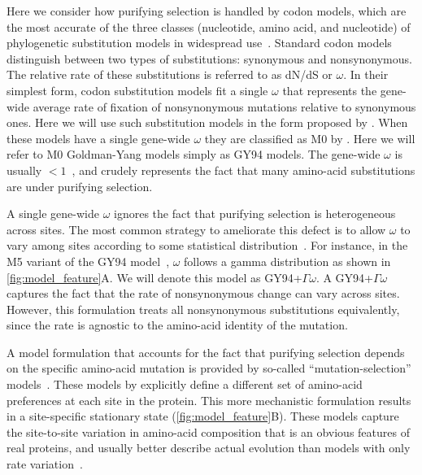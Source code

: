 \documentclass[11pt]{article}
\begin{document}
Here we consider how purifying selection is handled by codon models, which are the most accurate of the three classes (nucleotide, amino acid, and nucleotide) of phylogenetic substitution models in widespread use~\citep{arenas2015trends}.
Standard codon models distinguish between two types of substitutions: synonymous and nonsynonymous.
The relative rate of these substitutions is referred to as dN/dS or $\omega$.
In their simplest form, codon substitution models fit a single $\omega$ that represents the gene-wide average rate of fixation of nonsynonymous mutations relative to synonymous ones.
Here we will use such substitution models in the form proposed by \citet{goldman1994codon}.
When these models have a single gene-wide $\omega$ they are classified as M0 by \citet{yang2000codon}.
Here we will refer to M0 Goldman-Yang models simply as GY94 models. 
The gene-wide $\omega$ is usually $<1$~\citep{murrell2015gene}, and crudely represents the fact that many amino-acid substitutions are under purifying selection.

A single gene-wide $\omega$ ignores the fact that purifying selection is heterogeneous across sites.
The most common strategy to ameliorate this defect is to allow $\omega$ to vary among sites according to some statistical distribution~\citep{yang1994maximum,yang2000codon}.
For instance, in the M5 variant of the GY94 model~\citep{yang2000codon}, $\omega$ follows a gamma distribution as shown in \ref{fig:model_feature}A.
We will denote this model as GY94+$\Gamma\omega$.
A GY94+$\Gamma\omega$ captures the fact that the rate of nonsynonymous change can vary across sites. 
However, this formulation treats all nonsynonymous substitutions equivalently, since the rate is agnostic to the amino-acid identity of the mutation. 

A model formulation that accounts for the fact that purifying selection depends on the specific amino-acid mutation is provided by so-called ``mutation-selection'' models~\citep{halpern1998evolutionary,yang2008mutation,rodrigue2010mutation,tamuri2012estimating,mccandlish2014modeling}.
These models by explicitly define a different set of amino-acid preferences at each site in the protein. 
This more mechanistic formulation results in a site-specific stationary state (\ref{fig:model_feature}B). 
These models capture the site-to-site variation in amino-acid composition that is an obvious features of real proteins, and usually better describe actual evolution than models with only rate variation~\citep{lartillot2004bayesian, le2008phylogenetic, rodrigue2010mutation,hilton2017phydms,bloom2014experimentally}.
\end{document}
